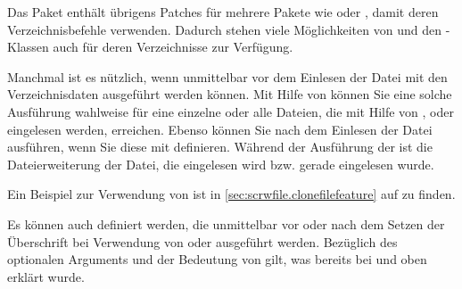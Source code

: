 Das Paket \hyperref[cha:scrhack]{}%
 enthält übrigens
Patches für mehrere Pakete wie  oder , damit
deren Verzeichnisbefehle  verwenden. Dadurch stehen viele
Möglichkeiten von  und den \KOMAScript-Klassen auch für
deren Verzeichnisse zur Verfügung.%
\EndIndexGroup


\begin{Declaration}
\end{Declaration}
Manchmal ist es nützlich, wenn unmittelbar vor dem Einlesen der Datei mit den
Verzeichnisdaten  ausgeführt werden können. Mit Hilfe von
 können Sie eine solche Ausführung
wahlweise für eine einzelne  oder alle Dateien, die
mit Hilfe von ,
 oder 
eingelesen werden, erreichen. Ebenso können Sie  nach dem
Einlesen der Datei ausführen, wenn Sie diese mit 
definieren. Während der Ausführung der  ist
 die
Dateierweiterung der Datei, die eingelesen wird bzw. gerade eingelesen wurde.

Ein Beispiel zur Verwendung von 
ist in \autoref{sec:scrwfile.clonefilefeature} auf
 zu finden.
%
\EndIndexGroup


\begin{Declaration}
\end{Declaration}
Es können auch  definiert werden, die unmittelbar vor oder
nach dem Setzen der Überschrift bei Verwendung von
 oder 
ausgeführt werden. Bezüglich des optionalen Arguments und der Bedeutung von
 gilt, was
bereits bei  und
 oben erklärt wurde.%
\EndIndexGroup


